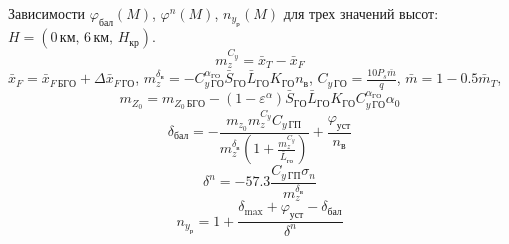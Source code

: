 Зависимости $\varphi_{бал}(M)$, $\varphi^n(M)$, $n_{y_р}(M)$ для трех значений
высот: $H=(0 \, км,\, 6 \, км,\, H_{кр})$.
\[
    m_z^{C_y} = \bar{x}_T - \bar{x}_F
\]
$\bar{x}_{F} = \bar{x}_{F\, БГО} + \Delta \bar{x}_{F\, ГО}$, $m_z^{\delta_в} = 
-C_{y\, {ГО}}^{\alpha_{ГО}} \bar{S}_{ГО} \bar{L}_{ГО} K_{ГО} n_в$, $C_{y\, {ГО}}
= \frac{10 P_s \bar{m}}{q}$, $\bar{m} = 1 - 0.5 \bar{m}_{T}$,
\[
    m_{Z_0} = m_{Z_0\, БГО} - 
    (1-\varepsilon^\alpha)\bar{S}_{ГО} \bar{L}_{ГО} K_{ГО} C_{y\,{ГО}}^{\alpha_{ГО}}
    \alpha_0
\]
\[
    \delta_{бал}  = - \frac{m_{z_0} m_z^{C_y} C_{y\, {ГП}}}{ m_z^{\delta_в}
    \left(1 + \frac{m_z^{C_y}}{\bar{L}_{го}}\right)} + \frac{\varphi_{уст}}{n_в}
\]
\[
    \delta^n = -57.3 \frac{C_{y\, ГП} \sigma_n}{ m_z^{\delta_в}}
\]
\[
    n_{y_р} = 1 + \frac{\delta_{\max} + \varphi_{уст} - \delta_{бал}}{\delta^n}
\]

